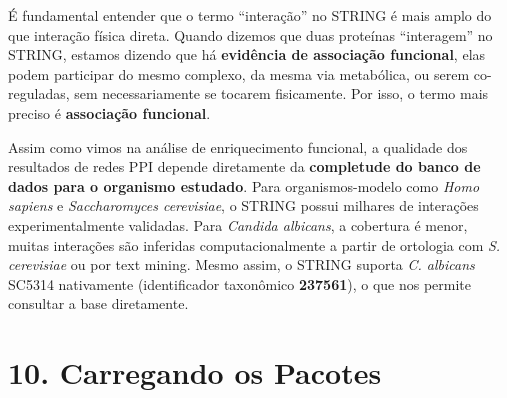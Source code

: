 \documentclass[
  letterpaper,
  DIV=11,
  numbers=noendperiod]{scrreprt}
\begin{document}
\begin{tcolorbox}[enhanced jigsaw, arc=.35mm, colframe=quarto-callout-important-color-frame, breakable, bottomrule=.15mm, colback=white, left=2mm, titlerule=0mm, opacityback=0, title=\textcolor{quarto-callout-important-color}{\faExclamation}\hspace{0.5em}{Interações ≠ Interações Físicas}, leftrule=.75mm, colbacktitle=quarto-callout-important-color!10!white, bottomtitle=1mm, toprule=.15mm, toptitle=1mm, rightrule=.15mm, opacitybacktitle=0.6, coltitle=black]

É fundamental entender que o termo ``interação'' no STRING é mais amplo
do que interação física direta. Quando dizemos que duas proteínas
``interagem'' no STRING, estamos dizendo que há \textbf{evidência de
associação funcional}, elas podem participar do mesmo complexo, da mesma
via metabólica, ou serem co-reguladas, sem necessariamente se tocarem
fisicamente. Por isso, o termo mais preciso é \textbf{associação
funcional}.

\end{tcolorbox}

\begin{tcolorbox}[enhanced jigsaw, arc=.35mm, colframe=quarto-callout-note-color-frame, breakable, bottomrule=.15mm, colback=white, left=2mm, titlerule=0mm, opacityback=0, title=\textcolor{quarto-callout-note-color}{\faInfo}\hspace{0.5em}{Ponto Importante --- Bancos de Dados Curados e Organismos Não-Modelo}, leftrule=.75mm, colbacktitle=quarto-callout-note-color!10!white, bottomtitle=1mm, toprule=.15mm, toptitle=1mm, rightrule=.15mm, opacitybacktitle=0.6, coltitle=black]

Assim como vimos na análise de enriquecimento funcional, a qualidade dos
resultados de redes PPI depende diretamente da \textbf{completude do
banco de dados para o organismo estudado}. Para organismos-modelo como
\emph{Homo sapiens} e \emph{Saccharomyces cerevisiae}, o STRING possui
milhares de interações experimentalmente validadas. Para \emph{Candida
albicans}, a cobertura é menor, muitas interações são inferidas
computacionalmente a partir de ortologia com \emph{S. cerevisiae} ou por
text mining. Mesmo assim, o STRING suporta \emph{C. albicans} SC5314
nativamente (identificador taxonômico \textbf{237561}), o que nos
permite consultar a base diretamente.

\end{tcolorbox}

\section{10. Carregando os Pacotes}\label{carregando-os-pacotes-2}
\end{document}
